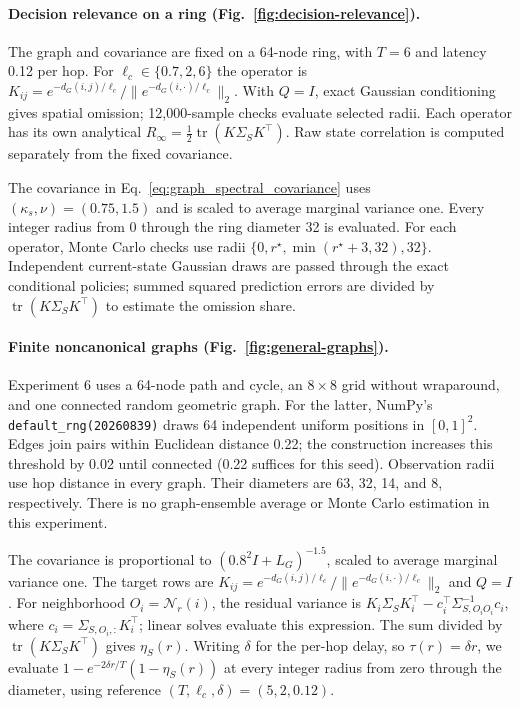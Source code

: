 \paragraph{Decision relevance on a ring (Fig.~\ref{fig:decision-relevance}).}
The graph and covariance are fixed on a 64-node ring, with $T=6$ and latency
0.12 per hop. For $\ell_c\in\{0.7,2,6\}$ the operator is
$K_{ij}=e^{-d_G(i,j)/\ell_c}/\|e^{-d_G(i,\cdot)/\ell_c}\|_2$.
With $Q=I$, exact Gaussian conditioning gives spatial omission; 12,000-sample
checks evaluate selected radii. Each operator has its own analytical
$R_\infty=\tfrac12\operatorname{tr}(K\Sigma_S K^\top)$.
Raw state correlation is computed separately from the fixed covariance.

The covariance in Eq.~\eqref{eq:graph_spectral_covariance} uses
$(\kappa_s,\nu)=(0.75,1.5)$ and is scaled to average marginal variance one.
Every integer radius from 0 through the ring diameter 32 is evaluated.
For each operator, Monte Carlo checks use radii
$\{0,r^\star,\min(r^\star+3,32),32\}$. Independent current-state Gaussian
draws are passed through the exact conditional policies; summed squared
prediction errors are divided by $\operatorname{tr}(K\Sigma_SK^\top)$
to estimate the omission share.

\paragraph{Finite noncanonical graphs (Fig.~\ref{fig:general-graphs}).}
Experiment 6 uses a 64-node path and cycle, an $8\times8$
grid without wraparound, and one connected random geometric graph.
For the latter, NumPy's \texttt{default\_rng(20260839)} draws 64 independent
uniform positions in $[0,1]^2$. Edges join pairs within Euclidean distance
0.22; the construction increases this threshold by 0.02 until connected
(0.22 suffices for this seed). Observation radii use hop distance in every
graph. Their diameters are 63, 32, 14, and 8, respectively.
There is no graph-ensemble average or Monte Carlo estimation in this experiment.

The covariance is proportional to $(0.8^2I+L_G)^{-1.5}$, scaled to average
marginal variance one. The target rows are
$K_{ij}=e^{-d_G(i,j)/\ell_c}/\|e^{-d_G(i,\cdot)/\ell_c}\|_2$ and $Q=I$.
For neighborhood $O_i=\mathcal N_r(i)$, the residual variance is
$K_i\Sigma_S K_i^\top-c_i^\top\Sigma_{S,O_iO_i}^{-1}c_i$,
where $c_i=\Sigma_{S,O_i,:}K_i^\top$; linear solves evaluate this expression.
The sum divided by $\operatorname{tr}(K\Sigma_S K^\top)$ gives $\eta_S(r)$.
Writing $\delta$ for the per-hop delay, so $\tau(r)=\delta r$,
we evaluate $1-e^{-2\delta r/T}(1-\eta_S(r))$ at every integer radius from zero
through the diameter, using reference $(T,\ell_c,\delta)=(5,2,0.12)$.

